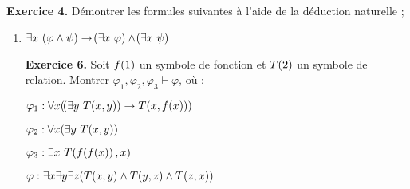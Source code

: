 \documentclass[a4paper,french,bookmarks]{book}
\begin{document}
    \textbf{Exercice 4.} Démontrer les formules suivantes à l'aide de la déduction naturelle ;
    \begin{enumerate}
        \item $\exists x \  \p{\varphi \land \psi} \rightarrow \p{\exists x \ \varphi} \land \p{\exists x \ \psi}$
        
    
     \textbf{Exercice 6.} Soit $f\!\left(1\right)$ un symbole de fonction et $T\!\left(2\right)$ un symbole de relation. Montrer $\varphi_1, \varphi_2, \varphi_3 \vdash \varphi$, où :
     \begin{enumerate}
         \itt $\varphi_1 : \forall x \p{\p{\exists y \ T\p{x, y}} \to T\p{x, f\p{x}}}$
         
         \itt $\varphi_2 : \forall x \p{\exists y \ T\p{x, y}}$
         
         \itt $\varphi_3 : \exists x \ T\!\left(f\!\left(f\!\left(x\right)\right), x\right)$
         
         \itt $\varphi : \exists x \exists y \exists z \!\left(T\!\left(x, y\right) \land T\!\left(y, z\right) \land T\!\left(z, x\right)\right)$
         
         \
     \end{enumerate}
    \end{enumerate}
    \newpage
    
\end{document}
